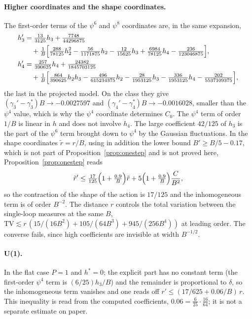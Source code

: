\documentclass[11pt,a4paper]{article}
\theoremstyle{definition}
\theoremstyle{remark}
\begin{document}
\paragraph{Higher coordinates and the shape coordinates.}
The first-order terms of the $\psi^6$ and $\psi^8$ coordinates are, in the same expansion,
\begin{align*}
h_3'&=\tfrac{13}{3125}h_3+\tfrac{7748}{44296875}\\
&\quad+\tfrac1B\Bigl[\tfrac{288}{78125}h_2^2-\tfrac{56}{1171875}h_2-\tfrac{12}{15625}h_3+\tfrac{6984}{78125}h_4-\tfrac{236}{123046875}\Bigr],\\
h_4'&=\tfrac{257}{390625}h_4+\tfrac{24382}{1845703125}\\
&\quad+\tfrac1B\Bigl[\tfrac{864}{390625}h_2h_3-\tfrac{496}{615234375}h_2-\tfrac{28}{1953125}h_3-\tfrac{336}{1953125}h_4-\tfrac{202}{5537109375}\Bigr],
\end{align*}
the last in the projected model.
On the class they give $(\gamma_3'-\gamma_3^*)B\to-0.0027597$ and $(\gamma_4'-\gamma_4^*)B\to-0.0016028$, smaller than the $\psi^4$ value, which is why the $\psi^4$ coordinate determines $C_0$.
The $\psi^4$ term of order $1/B$ is linear in $h$ and does not involve $h_4$.
The large coefficient $42/125$ of $h_3$ is the part of the $\psi^6$ term brought down to $\psi^4$ by the Gaussian fluctuations.
In the shape coordinates $\tilde r=r/B$, using in addition the lower bound $B'\ge B/5-0.17$, which is not part of Proposition~\ref{prop:onestep} and is not proved here, Proposition~\ref{prop:onestep} reads
\[
\tilde r'\le\tfrac{17}{125}\Bigl(1+\tfrac{0.9}{B}\Bigr)\tilde r+5\Bigl(1+\tfrac{0.9}{B}\Bigr)\frac{C}{B^2},
\]
so the contraction of the shape of the action is $17/125$ and the inhomogeneous term is of order $B^{-2}$.
The distance $r$ controls the total variation between the single-loop measures at the same $B$, $\mathrm{TV}\lesssim r\,(15/(16B^2)+105/(64B^3)+945/(256B^4))$ at leading order.
The converse fails, since high coefficients are invisible at width $B^{-1/2}$.

\paragraph{U(1).}
In the flat case $P=1$ and $h^*=0$; the explicit part has no constant term (the first-order $\psi^4$ term is $(6/25)h_3/B$) and the remainder is proportional to $\delta$, so the inhomogeneous term vanishes and one reads off $r'\le(17/625+0.06/B)\,r$.
This inequality is read from the computed coefficients, $0.06=\tfrac6{25}\cdot\tfrac{16}{64}$; it is not a separate estimate on paper.
\end{document}
